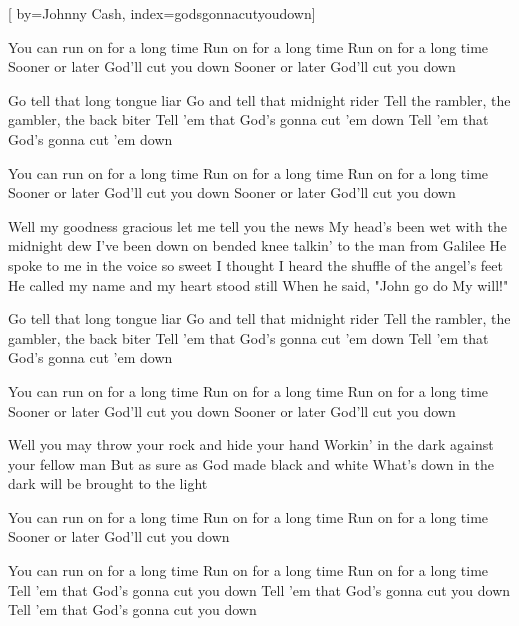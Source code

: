 [%
    by={Johnny Cash},
    index={godsgonnacutyoudown}]


    \label{godsgonnacutyoudown}


    \beginchorus
        You can run on for a long time
        Run on for a long time
        Run on for a long time
        Sooner or later God'll cut you down
        Sooner or later God'll cut you down
    \endchorus

    \beginverse*
        Go tell that long tongue liar
        Go and tell that midnight rider
        Tell the rambler, the gambler, the back biter
        Tell 'em that God's gonna cut 'em down
        Tell 'em that God's gonna cut 'em down
    \endverse

    \beginchorus
        You can run on for a long time
        Run on for a long time
        Run on for a long time
        Sooner or later God'll cut you down
        Sooner or later God'll cut you down
    \endchorus

    \beginverse
        Well my goodness gracious let me tell you the news
        My head's been wet with the midnight dew
        I've been down on bended knee talkin' to the man from Galilee
        He spoke to me in the voice so sweet
        I thought I heard the shuffle of the angel's feet
        He called my name and my heart stood still
        When he said, "John go do My will!"
    \endverse

    \beginverse*
        Go tell that long tongue liar
        Go and tell that midnight rider
        Tell the rambler, the gambler, the back biter
        Tell 'em that God's gonna cut 'em down
        Tell 'em that God's gonna cut 'em down
    \endverse

    \beginchorus
        You can run on for a long time
        Run on for a long time
        Run on for a long time
        Sooner or later God'll cut you down
        Sooner or later God'll cut you down
    \endchorus

    \beginverse
        Well you may throw your rock and hide your hand
        Workin' in the dark against your fellow man
        But as sure as God made black and white
        What's down in the dark will be brought to the light
    \endverse

    \beginchorus
        You can run on for a long time
        Run on for a long time
        Run on for a long time
        Sooner or later God'll cut you down
    \endchorus

    \beginchorus
        You can run on for a long time
        Run on for a long time
        Run on for a long time
        Tell 'em that God's gonna cut you down
        Tell 'em that God's gonna cut you down
        Tell 'em that God's gonna cut you down
    \endchorus
\endsong
